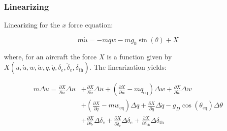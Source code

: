 
\subsubsection{Linearizing}

Linearizing for the $x$ force equation:

\begin{equation}
  \label{eqn.eqn.aircraft.label_eqn_1}
  m\dot{u}=-mqw-mg_{0}\sin(\theta)+X
\end{equation}

where, for an aircraft the force $X$ is a function given by $X(u,\dot{u},w,\dot{w},q,\dot{q},\delta_{e},\dot{\delta}_{e},\delta_{\text{th}})$.
The linearization yields:

\begin{equation*}
  \label{eqn.eqn.aircraft.label_eqn_2}
  \begin{split}
    m\Delta\dot{u}=
    \frac{\partial{}X}{\partial{}u}\Delta u&+
    \frac{\partial{}X}{\partial{}\dot{u}}\Delta\dot{u}+
    \left(\frac{\partial{}X}{\partial{}w}-mq_{\text{eq}}\right)\Delta w+
    \frac{\partial{}X}{\partial{}\dot{w}}\Delta\dot{w} \\
    &+
    \left(\frac{\partial{}X}{\partial{}q}-mw_{\text{eq}}\right)\Delta q+
    \frac{\partial{}X}{\partial{}\dot{q}}\Delta\dot{q}-
    g_{D}\cos(\theta_{\text{eq}})\Delta\theta \\
    &+
    \frac{\partial{}X}{\partial{}\delta_{e}}\Delta\delta_{e}+
    \frac{\partial{}X}{\partial{}\dot{\delta}_{e}}\Delta\dot{\delta}_{e}+
    \frac{\partial{}X}{\partial{}\delta_{\text{th}}}\Delta\delta_{\text{th}}
  \end{split}
\end{equation*}

